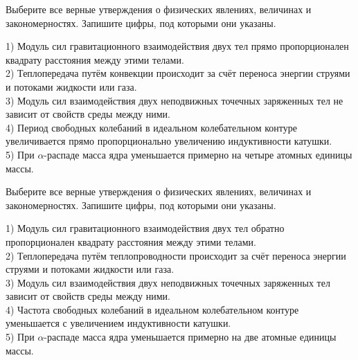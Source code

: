 \begin{taskbasic}[code={\label{task:kim18_img9}}]
Выберите все верные утверждения о физических явлениях, величинах и закономерностях. Запишите цифры, под которыми они указаны.

1) Модуль сил гравитационного взаимодействия двух тел прямо пропорционален квадрату расстояния между этими телами.\\
2) Теплопередача путём конвекции происходит за счёт переноса энергии струями и потоками жидкости или газа.\\
3) Модуль сил взаимодействия двух неподвижных точечных заряженных тел не зависит от свойств среды между ними.\\
4) Период свободных колебаний в идеальном колебательном контуре увеличивается прямо пропорционально увеличению индуктивности катушки.\\
5) При $\alpha$-распаде масса ядра уменьшается примерно на четыре атомных единицы массы.

\end{taskbasic}

\begin{taskbasic}[code={\label{task:kim18_img10}}]
Выберите все верные утверждения о физических явлениях, величинах и закономерностях. Запишите цифры, под которыми они указаны.

1) Модуль сил гравитационного взаимодействия двух тел обратно пропорционален квадрату расстояния между этими телами.\\
2) Теплопередача путём теплопроводности происходит за счёт переноса энергии струями и потоками жидкости или газа.\\
3) Модуль сил взаимодействия двух неподвижных точечных заряженных тел зависит от свойств среды между ними.\\
4) Частота свободных колебаний в идеальном колебательном контуре уменьшается с увеличением индуктивности катушки.\\
5) При $\alpha$-распаде масса ядра уменьшается примерно на две атомные единицы массы.

\end{taskbasic}


